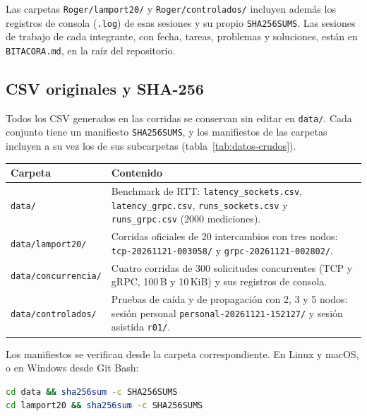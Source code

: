 Las carpetas \texttt{Roger/lamport20/} y \texttt{Roger/controlados/} incluyen además los registros de consola (\texttt{.log}) de esas sesiones y su propio \texttt{SHA256SUMS}. Las sesiones de trabajo de cada integrante, con fecha, tareas, problemas y soluciones, están en \texttt{BITACORA.md}, en la raíz del repositorio.

\subsection{CSV originales y SHA-256}

Todos los CSV generados en las corridas se conservan sin editar en \texttt{data/}. Cada conjunto tiene un manifiesto \texttt{SHA256SUMS}, y los manifiestos de las carpetas incluyen a su vez los de sus subcarpetas (tabla~\ref{tab:datos-crudos}).

\par\medskip
\noindent\begin{minipage}{\linewidth}
\centering
\small
\makeatletter{}\makeatother
\caption{Datos crudos y manifiestos de integridad}
\label{tab:datos-crudos}
\begin{tabularx}{\linewidth}{@{}>{\raggedright\arraybackslash}p{3.4cm} >{\raggedright\arraybackslash}X@{}}
\toprule
Carpeta & Contenido \\
\midrule
\nolinkurl{data/} & Benchmark de RTT: \nolinkurl{latency_sockets.csv}, \nolinkurl{latency_grpc.csv}, \nolinkurl{runs_sockets.csv} y \nolinkurl{runs_grpc.csv} (2000 mediciones). \\
\nolinkurl{data/lamport20/} & Corridas oficiales de 20 intercambios con tres nodos: \nolinkurl{tcp-20261121-003058/} y \nolinkurl{grpc-20261121-002802/}. \\
\nolinkurl{data/concurrencia/} & Cuatro corridas de 300 solicitudes concurrentes (TCP y gRPC, 100\,B y 10\,KiB) y sus registros de consola. \\
\nolinkurl{data/controlados/} & Pruebas de caída y de propagación con 2, 3 y 5 nodos: sesión personal \nolinkurl{personal-20261121-152127/} y sesión asistida \nolinkurl{r01/}. \\
\bottomrule
\end{tabularx}
\end{minipage}
\par\medskip

Los manifiestos se verifican desde la carpeta correspondiente. En Linux y macOS, o en Windows desde Git Bash:

\begin{lstlisting}[language=bash,caption={Verificación de la integridad de los datos}]
cd data && sha256sum -c SHA256SUMS
cd lamport20 && sha256sum -c SHA256SUMS
\end{lstlisting}

